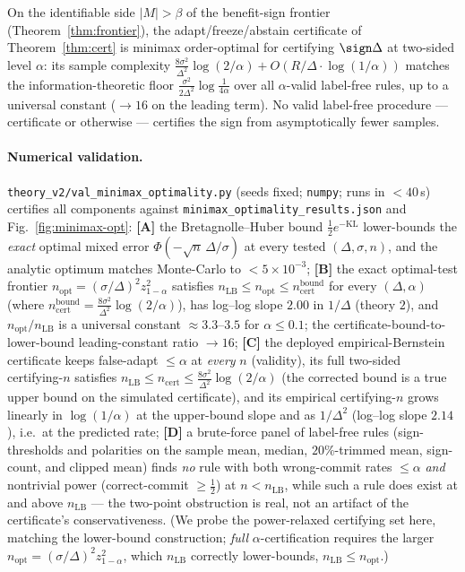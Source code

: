 \begin{corollary}\label{cor:cert-minimax}
On the identifiable side $|M|>\beta$ of the benefit-sign frontier
(Theorem~\ref{thm:frontier}), the adapt/freeze/abstain certificate of Theorem~\ref{thm:cert} is
minimax order-optimal for certifying $\sign\Delta$ at two-sided level $\alpha$: its sample
complexity $\tfrac{8\sigma^2}{\Delta^2}\log(2/\alpha)+O(R/\Delta\cdot\log(1/\alpha))$ matches the
information-theoretic floor $\tfrac{\sigma^2}{2\Delta^2}\log\tfrac1{4\alpha}$ over all
$\alpha$-valid label-free rules, up to a universal constant ($\to16$ on the leading term). No
valid label-free procedure --- certificate or otherwise --- certifies the sign from
asymptotically fewer samples.
\end{corollary}

\paragraph{Numerical validation.}
\texttt{theory\_v2/val\_minimax\_optimality.py} (seeds fixed; \texttt{numpy}; runs in
$<\!40$\,s) certifies all components against
\texttt{minimax\_optimality\_results.json} and Fig.~\ref{fig:minimax-opt}:
\textbf{[A]} the Bretagnolle--Huber bound $\tfrac12 e^{-\mathrm{KL}}$ lower-bounds the
\emph{exact} optimal mixed error $\Phi(-\sqrt n\,\Delta/\sigma)$ at every tested
$(\Delta,\sigma,n)$, and the analytic optimum matches Monte-Carlo to $<\!5\times10^{-3}$;
\textbf{[B]} the exact optimal-test frontier $n_{\mathrm{opt}}=(\sigma/\Delta)^2 z_{1-\alpha}^2$
satisfies $n_{\mathrm{LB}}\le n_{\mathrm{opt}}\le n_{\mathrm{cert}}^{\mathrm{bound}}$ for every
$(\Delta,\alpha)$ (where $n_{\mathrm{cert}}^{\mathrm{bound}}=\tfrac{8\sigma^2}{\Delta^2}\log(2/\alpha)$),
has log--log slope $2.00$ in $1/\Delta$ (theory $2$), and $n_{\mathrm{opt}}/n_{\mathrm{LB}}$ is a
universal constant $\approx 3.3$--$3.5$ for $\alpha\le0.1$; the certificate-bound-to-lower-bound
leading-constant ratio $\to16$;
\textbf{[C]} the deployed empirical-Bernstein certificate keeps false-adapt $\le\alpha$ at
\emph{every} $n$ (validity), its full two-sided certifying-$n$ satisfies
$n_{\mathrm{LB}}\le n_{\mathrm{cert}}\le\tfrac{8\sigma^2}{\Delta^2}\log(2/\alpha)$ (the corrected
bound is a true upper bound on the simulated certificate), and its empirical certifying-$n$ grows
linearly in $\log(1/\alpha)$ at the upper-bound slope and as $1/\Delta^2$ (log--log slope $2.14$),
i.e.\ at the predicted rate;
\textbf{[D]} a brute-force panel of label-free rules (sign-thresholds and polarities on the
sample mean, median, $20\%$-trimmed mean, sign-count, and clipped mean) finds \emph{no} rule with
both wrong-commit rates $\le\alpha$ \emph{and} nontrivial power (correct-commit $\ge\tfrac12$) at
$n<n_{\mathrm{LB}}$, while such a rule does exist at and above $n_{\mathrm{LB}}$ --- the two-point
obstruction is real, not an artifact of the certificate's conservativeness. (We probe the
power-relaxed certifying set here, matching the lower-bound construction; \emph{full}
$\alpha$-certification requires the larger $n_{\mathrm{opt}}=(\sigma/\Delta)^2z_{1-\alpha}^2$,
which $n_{\mathrm{LB}}$ correctly lower-bounds, $n_{\mathrm{LB}}\le n_{\mathrm{opt}}$.)

